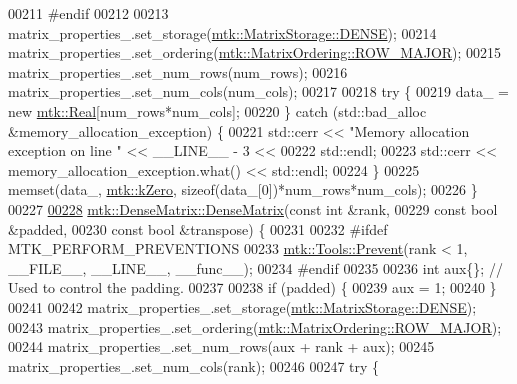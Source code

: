 \begin{DoxyCode}
00211 \textcolor{preprocessor}{  #endif}
00212 
00213   matrix\_properties\_.set\_storage(\hyperlink{namespacemtk_ga25b67ec6a2afeee69f9bb196a9c66619a0706fbbd929bd8abc4de386c53d439ff}{mtk::MatrixStorage::DENSE});
00214   matrix\_properties\_.set\_ordering(\hyperlink{namespacemtk_ga622801bd9f912d0f976c3e383f5f581ca21541962976d7709c26e9cd8385bd648}{mtk::MatrixOrdering::ROW\_MAJOR});
00215   matrix\_properties\_.set\_num\_rows(num\_rows);
00216   matrix\_properties\_.set\_num\_cols(num\_cols);
00217 
00218   \textcolor{keywordflow}{try} \{
00219     data\_ = \textcolor{keyword}{new} \hyperlink{group__c01-roots_gac080bbbf5cbb5502c9f00405f894857d}{mtk::Real}[num\_rows*num\_cols];
00220   \} \textcolor{keywordflow}{catch} (std::bad\_alloc &memory\_allocation\_exception) \{
00221     std::cerr << \textcolor{stringliteral}{"Memory allocation exception on line "} << \_\_LINE\_\_ - 3 <<
00222       std::endl;
00223     std::cerr << memory\_allocation\_exception.what() << std::endl;
00224   \}
00225   memset(data\_, \hyperlink{group__c01-roots_ga59a451a5fae30d59649bcda274fea271}{mtk::kZero}, \textcolor{keyword}{sizeof}(data\_[0])*num\_rows*num\_cols);
00226 \}
00227 
\hypertarget{mtk__dense__matrix_8cc_source_l00228}{}\hyperlink{classmtk_1_1DenseMatrix_a4ef0dec1b5558fcf00719bfac059ec68}{00228} \hyperlink{classmtk_1_1DenseMatrix_a0c75ee704707983f935b02835eab0933}{mtk::DenseMatrix::DenseMatrix}(\textcolor{keyword}{const} \textcolor{keywordtype}{int} &rank,
00229                               \textcolor{keyword}{const} \textcolor{keywordtype}{bool} &padded,
00230                               \textcolor{keyword}{const} \textcolor{keywordtype}{bool} &transpose) \{
00231 
00232 \textcolor{preprocessor}{  #ifdef MTK\_PERFORM\_PREVENTIONS}
00233   \hyperlink{classmtk_1_1Tools_a332324c6f25e66be9dff48c5987a3b9f}{mtk::Tools::Prevent}(rank < 1, \_\_FILE\_\_, \_\_LINE\_\_, \_\_func\_\_);
00234 \textcolor{preprocessor}{  #endif}
00235 
00236   \textcolor{keywordtype}{int} aux\{\};  \textcolor{comment}{// Used to control the padding.}
00237 
00238   \textcolor{keywordflow}{if} (padded) \{
00239     aux = 1;
00240   \}
00241 
00242   matrix\_properties\_.set\_storage(\hyperlink{namespacemtk_ga25b67ec6a2afeee69f9bb196a9c66619a0706fbbd929bd8abc4de386c53d439ff}{mtk::MatrixStorage::DENSE});
00243   matrix\_properties\_.set\_ordering(\hyperlink{namespacemtk_ga622801bd9f912d0f976c3e383f5f581ca21541962976d7709c26e9cd8385bd648}{mtk::MatrixOrdering::ROW\_MAJOR});
00244   matrix\_properties\_.set\_num\_rows(aux + rank + aux);
00245   matrix\_properties\_.set\_num\_cols(rank);
00246 
00247   \textcolor{keywordflow}{try} \{

\end{DoxyCode}
